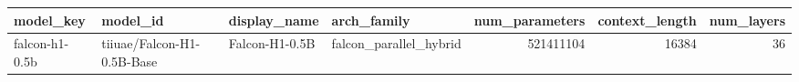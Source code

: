 \begin{tabular}{llllrrr}
\toprule
model_key & model_id & display_name & arch_family & num_parameters & context_length & num_layers \\
\midrule
falcon-h1-0.5b & tiiuae/Falcon-H1-0.5B-Base & Falcon-H1-0.5B & falcon_parallel_hybrid & 521411104 & 16384 & 36 \\
\bottomrule
\end{tabular}

